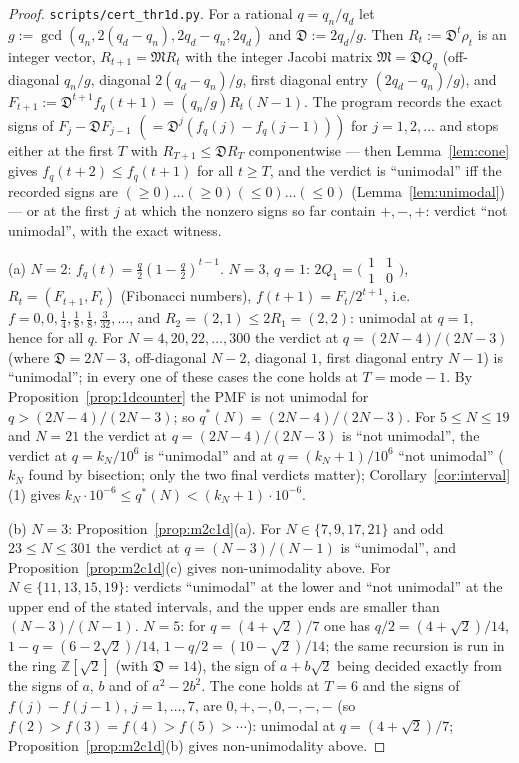 \documentclass[11pt,a4paper]{article}
\theoremstyle{definition}
\newcommand{\fD}{\mathfrak D}
\begin{document}
\begin{proof}
\texttt{scripts/cert\_thr1d.py}. For a rational $q=q_n/q_d$ let $g:=\gcd(q_n,2(q_d-q_n),2q_d-q_n,2q_d)$ and $\fD:=2q_d/g$. Then $R_t:=\fD^t\rho_t$ is an integer vector, $R_{t+1}=\mathfrak MR_t$ with the integer Jacobi matrix $\mathfrak M=\fD Q_q$ (off-diagonal $q_n/g$, diagonal $2(q_d-q_n)/g$, first diagonal entry $(2q_d-q_n)/g$), and $F_{t+1}:=\fD^{t+1}f_q(t+1)=(q_n/g)R_t(N-1)$. The program records the exact signs of $F_j-\fD F_{j-1}$ $(=\fD^j(f_q(j)-f_q(j-1)))$ for $j=1,2,\dots$ and stops either at the first $T$ with $R_{T+1}\le\fD R_T$ componentwise --- then Lemma~\ref{lem:cone} gives $f_q(t+2)\le f_q(t+1)$ for all $t\ge T$, and the verdict is ``unimodal'' iff the recorded signs are $(\ge0)\dots(\ge0)(\le0)\dots(\le0)$ (Lemma~\ref{lem:unimodal}) --- or at the first $j$ at which the nonzero signs so far contain $+,-,+$: verdict ``not unimodal'', with the exact witness.

(a) $N=2$: $f_q(t)=\frac q2(1-\frac q2)^{t-1}$. $N=3$, $q=1$: $2Q_1=\bigl(\begin{smallmatrix}1&1\\1&0\end{smallmatrix}\bigr)$, $R_t=(F_{t+1},F_t)$ (Fibonacci numbers), $f(t+1)=F_t/2^{t+1}$, i.e.\ $f=0,0,\frac14,\frac18,\frac18,\frac3{32},\dots$, and $R_2=(2,1)\le2R_1=(2,2)$: unimodal at $q=1$, hence for all $q$. For $N=4,20,22,\dots,300$ the verdict at $q=(2N-4)/(2N-3)$ (where $\fD=2N-3$, off-diagonal $N-2$, diagonal $1$, first diagonal entry $N-1$) is ``unimodal''; in every one of these cases the cone holds at $T=\text{mode}-1$. By Proposition~\ref{prop:1dcounter} the PMF is not unimodal for $q>(2N-4)/(2N-3)$; so $q^*(N)=(2N-4)/(2N-3)$. For $5\le N\le19$ and $N=21$ the verdict at $q=(2N-4)/(2N-3)$ is ``not unimodal'', the verdict at $q=k_N/10^6$ is ``unimodal'' and at $q=(k_N+1)/10^6$ ``not unimodal'' ($k_N$ found by bisection; only the two final verdicts matter); Corollary~\ref{cor:interval}(1) gives $k_N\cdot10^{-6}\le q^*(N)<(k_N+1)\cdot10^{-6}$.

(b) $N=3$: Proposition~\ref{prop:m2c1d}(a). For $N\in\{7,9,17,21\}$ and odd $23\le N\le301$ the verdict at $q=(N-3)/(N-1)$ is ``unimodal'', and Proposition~\ref{prop:m2c1d}(c) gives non-unimodality above. For $N\in\{11,13,15,19\}$: verdicts ``unimodal'' at the lower and ``not unimodal'' at the upper end of the stated intervals, and the upper ends are smaller than $(N-3)/(N-1)$. $N=5$: for $q=(4+\sqrt2)/7$ one has $q/2=(4+\sqrt2)/14$, $1-q=(6-2\sqrt2)/14$, $1-q/2=(10-\sqrt2)/14$; the same recursion is run in the ring $\mathbb Z[\sqrt2]$ (with $\fD=14$), the sign of $a+b\sqrt2$ being decided exactly from the signs of $a$, $b$ and of $a^2-2b^2$. The cone holds at $T=6$ and the signs of $f(j)-f(j-1)$, $j=1,\dots,7$, are $0,+,-,0,-,-,-$ (so $f(2)>f(3)=f(4)>f(5)>\cdots$): unimodal at $q=(4+\sqrt2)/7$; Proposition~\ref{prop:m2c1d}(b) gives non-unimodality above.


\end{proof}
\end{document}
